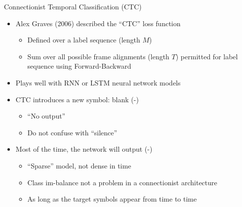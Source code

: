 \begin{frame}{Connectionist Temporal Classification (CTC)}
  \begin{itemize}
  \item Alex Graves (2006) described the ``CTC'' loss function
    \begin{itemize}
    \item Defined over a label sequence (length $M$)
    \item Sum over all possible frame alignments (length $T$) permitted for label sequence using Forward-Backward
    \end{itemize}
  \item Plays well with RNN or LSTM neural network models
  \item CTC introduces a new symbol: blank (-)
    \begin{itemize}
    \item ``No output''
    \item Do not confuse with ``silence''
    \end{itemize}
  \item Most of the time, the network will output (-)
    \begin{itemize}
    \item ``Sparse'' model, not dense in time
    \item Class im-balance not a problem in a connectionist architecture
    \item As long as the target symbols appear from time to time
    \end{itemize}
  \end{itemize}
\end{frame}

